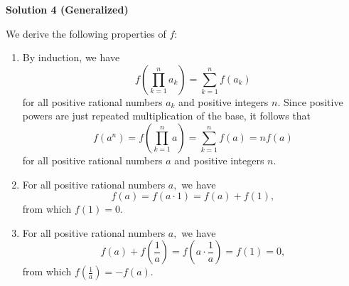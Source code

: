 \begin{enumerate}
 



\textbf{Solution 4 (Generalized)}

We derive the following properties of $f:$

            \begin{enumerate} 
        \item By induction, we have 
 \[f\left(\prod_{k=1}^{n}a_k\right)=\sum_{k=1}^{n}f(a_k)\] for all positive rational numbers $a_k$ and positive integers $n.$ Since positive powers are just repeated multiplication of the base, it follows that 
 \[f\left(a^n\right)=f\left(\prod_{k=1}^{n}a\right)=\sum_{k=1}^{n}f(a)=nf(a)\] for all positive rational numbers $a$ and positive integers $n.$


        \item For all positive rational numbers $a,$ we have 
 \[f(a)=f(a\cdot1)=f(a)+f(1),\] from which $f(1)=0.$

        \item For all positive rational numbers $a,$ we have 
 \[f(a)+f\left(\frac1a\right)=f\left(a\cdot\frac1a\right)=f(1)=0,\] from which $f\left({\frac 1a}\right)=-f(a).$


\end{enumerate}
\end{enumerate}
